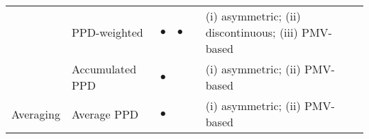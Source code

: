 \begin{landscape}
\begin{table}[!h]
\begin{tabular}{ m{2.5cm} m{3.5cm} m{1.5cm} m{1.5cm} m{1.75cm} m{6cm} }

            {}  & PPD-weighted & $\bullet$ & $\bullet$ & {} & {(i) asymmetric; (ii) discontinuous; \newline(iii) PMV-based} \\


            {}  & Accumulated PPD & $\bullet$ & {} & {} & {(i) asymmetric; (ii) PMV-based} \\

            \hline

            {Averaging}  & Average PPD & $\bullet$ & {} & {} & {(i) asymmetric; (ii) PMV-based} \\
            
            \end{tabular}
    
    
\end{table}
\end{landscape}
